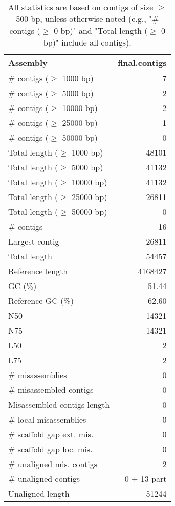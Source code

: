 \documentclass[12pt,a4paper]{article}
\begin{document}
\begin{table}[ht]
\begin{center}
\caption{All statistics are based on contigs of size $\geq$ 500 bp, unless otherwise noted (e.g., "\# contigs ($\geq$ 0 bp)" and "Total length ($\geq$ 0 bp)" include all contigs).}
\begin{tabular}{|l*{1}{|r}|}
\hline
Assembly & final.contigs \\ \hline
\# contigs ($\geq$ 1000 bp) & 7 \\ \hline
\# contigs ($\geq$ 5000 bp) & 2 \\ \hline
\# contigs ($\geq$ 10000 bp) & 2 \\ \hline
\# contigs ($\geq$ 25000 bp) & 1 \\ \hline
\# contigs ($\geq$ 50000 bp) & 0 \\ \hline
Total length ($\geq$ 1000 bp) & 48101 \\ \hline
Total length ($\geq$ 5000 bp) & 41132 \\ \hline
Total length ($\geq$ 10000 bp) & 41132 \\ \hline
Total length ($\geq$ 25000 bp) & 26811 \\ \hline
Total length ($\geq$ 50000 bp) & 0 \\ \hline
\# contigs & 16 \\ \hline
Largest contig & 26811 \\ \hline
Total length & 54457 \\ \hline
Reference length & 4168427 \\ \hline
GC (\%) & 51.44 \\ \hline
Reference GC (\%) & 62.60 \\ \hline
N50 & 14321 \\ \hline
N75 & 14321 \\ \hline
L50 & 2 \\ \hline
L75 & 2 \\ \hline
\# misassemblies & 0 \\ \hline
\# misassembled contigs & 0 \\ \hline
Misassembled contigs length & 0 \\ \hline
\# local misassemblies & 0 \\ \hline
\# scaffold gap ext. mis. & 0 \\ \hline
\# scaffold gap loc. mis. & 0 \\ \hline
\# unaligned mis. contigs & 2 \\ \hline
\# unaligned contigs & 0 + 13 part \\ \hline
Unaligned length & 51244 \\ \hline

\end{tabular}
\end{center}
\end{table}
\end{document}

